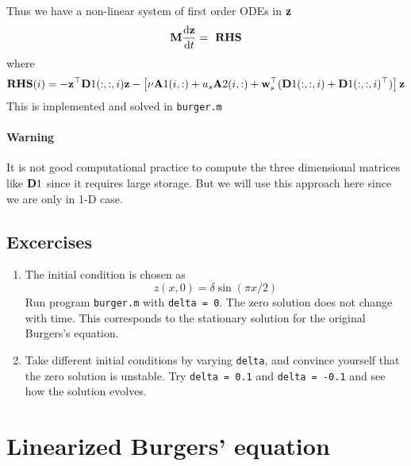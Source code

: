 \documentclass[12pt]{article}
\begin{document}
Thus we have a non-linear system of first order ODEs in ${\mathbf z}$
\begin{eqnarray*}
 {\mathbf M} \frac{\textrm{d} {\mathbf z}}{\textrm{d} t} = \textbf{ RHS} 
\end{eqnarray*}
where 
\begin{eqnarray*}
 \textbf{RHS}(i) = - {\mathbf z}^\top {\mathbf D}1(:,:,i) {\mathbf z} - \left[ \nu {\mathbf A}1(i,:) + u_s {\mathbf A}2(i,:) + {\mathbf w}_s^\top ({\mathbf D}1(:,:,i) + {\mathbf D}1(:,:,i)^\top) \right] {\mathbf z}
\end{eqnarray*}
This is implemented and solved in {\tt burger.m}

\paragraph{Warning} It is not good computational practice to compute the three dimensional matrices like ${\mathbf D}1$ since it requires large storage. But we will use this approach here since we are only in 1-D case.

\subsection{Excercises}

\begin{enumerate}

\item The initial condition is chosen as
\[
z(x,0) = \delta \sin(\pi x/2)
\]
Run program {\tt burger.m} with {\tt delta = 0}. The zero solution does not change with time. This corresponds to the stationary solution for the original Burgers's equation.

\item Take different initial conditions by varying {\tt delta}, and convince yourself that the zero solution is unstable. Try {\tt delta = 0.1} and {\tt delta = -0.1} and see how the solution evolves.
\end{enumerate}


\section{Linearized Burgers' equation}
\end{document}
